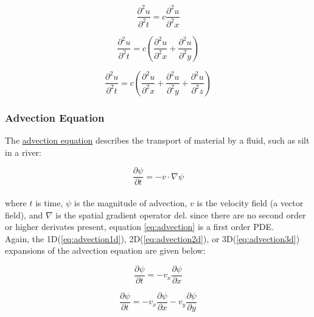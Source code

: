 { \begin{equation}\label{eq:wave1d}
  \frac{\partial^{2}u}{\partial^{2}t} = c\frac{\partial^{2}u}{\partial^{2}x}
  \end{equation}
  
   \begin{equation}\label{eq:wave2d}
  \frac{\partial^{2}u}{\partial^{2}t} = c\left(\frac{\partial^{2}u}{\partial^{2}x}+\frac{\partial^{2}u}{\partial^{2}y}\right)
  \end{equation}
  
   \begin{equation}\label{eq:wave3d}
  \frac{\partial^{2}u}{ \partial^{2}t} = c\left(\frac{\partial^{2}u}{\partial^{2}x}+\frac{\partial^{2}u}{\partial^{2}y}+\frac{\partial^{2}u}{\partial^{2}z} \right)
  \end{equation}
    
  \subsubsection{Advection Equation}
  
  The \href{https://en.wikipedia.org/wiki/Advection}{advection equation} describes the transport of material by a fluid, such as silt in a river:
  
   \begin{equation}\label{eq:advection}
  \frac{\partial \psi}{\partial t} = -v \cdot \nabla\psi
  \end{equation}
   \\
    where $t$ is time, $\psi$ is the magnitude of advection, $v$ is the velocity field (a vector field), and $\nabla$ is the spatial gradient operator del.  since there are no second order or higher derivates present, equation \ref{eq:advection} is a first order PDE.\\
    
    Again, the 1D(\ref{eq:advection1d}), 2D(\ref{eq:advection2d}), or 3D(\ref{eq:advection3d}) expansions of the advection equation are given below:
 
 \begin{equation}\label{eq:advection1d}
  \frac{\partial \psi}{\partial t} = -v_{x}\frac{\partial \psi}{\partial x}
  \end{equation}
  
   \begin{equation}\label{eq:advection2d}
  \frac{\partial \psi}{\partial t} = -v_{x}\frac{\partial \psi}{\partial x}-v_{y}\frac{\partial \psi}{\partial y}
  \end{equation}
  
}
